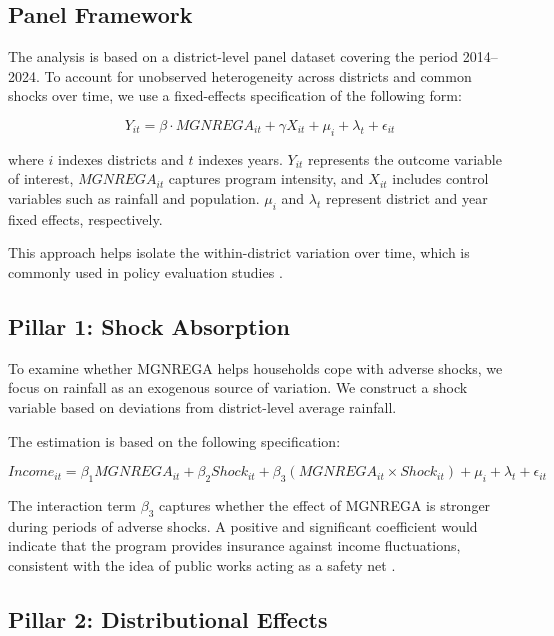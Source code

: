\documentclass[12pt]{article}
\begin{document}
\subsection{Panel Framework}

The analysis is based on a district-level panel dataset covering the period 2014–2024. To account for unobserved heterogeneity across districts and common shocks over time, we use a fixed-effects specification of the following form:

\begin{equation}
Y_{it} = \beta \cdot MGNREGA_{it} + \gamma X_{it} + \mu_i + \lambda_t + \epsilon_{it}
\end{equation}

where $i$ indexes districts and $t$ indexes years. $Y_{it}$ represents the outcome variable of interest, $MGNREGA_{it}$ captures program intensity, and $X_{it}$ includes control variables such as rainfall and population. $\mu_i$ and $\lambda_t$ represent district and year fixed effects, respectively.

This approach helps isolate the within-district variation over time, which is commonly used in policy evaluation studies \citep{ImbertPapp2015, Muralidharan2017}.

\subsection{Pillar 1: Shock Absorption}

To examine whether MGNREGA helps households cope with adverse shocks, we focus on rainfall as an exogenous source of variation. We construct a shock variable based on deviations from district-level average rainfall.

The estimation is based on the following specification:

\begin{equation}
Income_{it} = \beta_1 MGNREGA_{it} + \beta_2 Shock_{it} + \beta_3 (MGNREGA_{it} \times Shock_{it}) + \mu_i + \lambda_t + \epsilon_{it}
\end{equation}

The interaction term $\beta_3$ captures whether the effect of MGNREGA is stronger during periods of adverse shocks. A positive and significant coefficient would indicate that the program provides insurance against income fluctuations, consistent with the idea of public works acting as a safety net \citep{Townsend1994}.


\subsection{Pillar 2: Distributional Effects}
\end{document}

